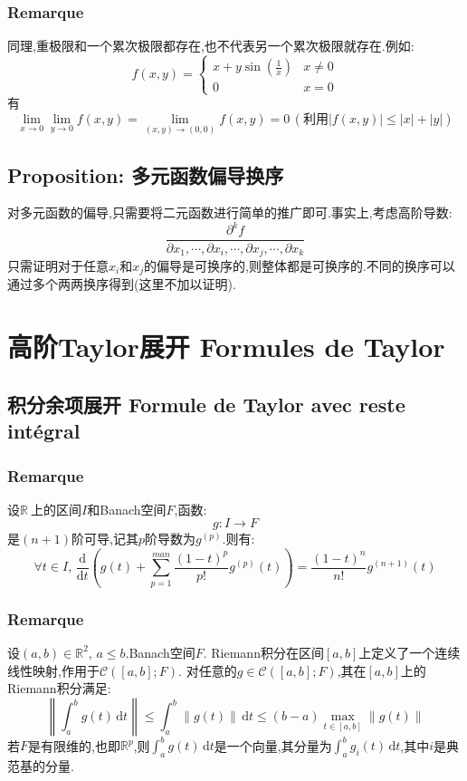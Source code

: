 \documentclass[12pt, a4paper, oneside]{ctexbook}
\newcommand{\di }{\text{d}}%
\newcommand{\R }{\mathbb{R}}%
\newcommand{\RR }{$\R\ $}%
\newcommand{\C }{\mathcal{C}}%
\begin{document}
  \subsubsection{Remarque}
  同理,重极限和一个累次极限都存在,也不代表另一个累次极限就存在.例如:
  $$
  f(x,y)=
    \begin{cases}
      x+y\sin(\frac{1}{x}) &x\neq 0\\
      0 &x= 0
      \end{cases}
  $$
  有
  $$
  \lim_{x\rightarrow 0}\lim_{y\rightarrow 0}f(x,y)=\lim_{(x,y)\rightarrow(0,0)}f(x,y)=0\, (\text{利用}\left\lvert f(x,y)\right\rvert \leq\left\lvert x\right\rvert+\left\lvert y\right\rvert)
  $$
  \subsection{Proposition: 多元函数偏导换序}
  对多元函数的偏导,只需要将二元函数进行简单的推广即可.事实上,考虑高阶导数:
  $$
  \frac{\partial^kf}{\partial x_1,\cdots,\partial x_i,\cdots,\partial x_j,\cdots,\partial x_k}
  $$
  只需证明对于任意$x_i$和$x_j$的偏导是可换序的,则整体都是可换序的.不同的换序可以通过多个两两换序得到(这里不加以证明).
  

  
\section{高阶Taylor展开  Formules de Taylor}
\subsection{积分余项展开 Formule de Taylor avec reste intégral}
  \subsubsection{Remarque}
  设\RR 上的区间$I$和Banach空间$F$,函数:
  $$
    g:I\rightarrow F
  $$
  是$(n+1)$阶可导,记其$p$阶导数为$g^{(p)}$.则有:
  $$
    \forall t\in I,\,\frac{\di}{\di t}(g(t)+\sum_{p=1}^{man}\frac{(1-t)^p}{p!}g^{(p)}(t))=\frac{(1-t)^n}{n!}g^{(n+1)}(t)
  $$
  \subsubsection{Remarque}
  设$(a,b)\in\R^2,\,a\leq b$.Banach空间$F$.
  Riemann积分在区间$[a,b]$上定义了一个连续线性映射,作用于$\C([a,b];F)$.
  对任意的$g\in \C([a,b];F)$,其在$[a,b]$上的Riemann积分满足:
  $$
  \left\lVert \int_{a}^{b} g(t) \,\di t \right\rVert \leq \int_{a}^{b} \left\lVert g(t)\right\rVert  \,\di t\leq (b-a)\max_{t\in[a,b]}\left\lVert g(t)\right\rVert
  $$
  若$F$是有限维的,也即$\R^p$,则$\int_{a}^{b} g(t) \,\di t$是一个向量,其分量为$\int_{a}^{b} g_i(t) \,\di t$,其中$i$是典范基的分量.
\end{document}
